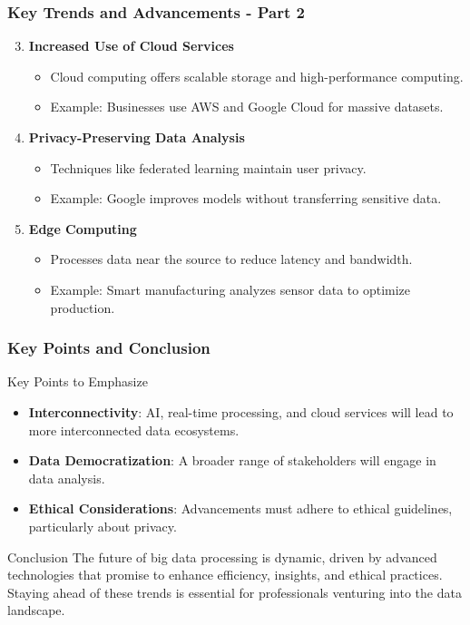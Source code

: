 \documentclass[aspectratio=169]{beamer}
\begin{document}
\begin{frame}[fragile]
    \frametitle{Key Trends and Advancements - Part 2}
    \begin{enumerate}
        \setcounter{enumi}{2} %
        \item \textbf{Increased Use of Cloud Services}
            \begin{itemize}
                \item Cloud computing offers scalable storage and high-performance computing.
                \item Example: Businesses use AWS and Google Cloud for massive datasets.
            \end{itemize}
        
        \item \textbf{Privacy-Preserving Data Analysis}
            \begin{itemize}
                \item Techniques like federated learning maintain user privacy.
                \item Example: Google improves models without transferring sensitive data.
            \end{itemize}
        
        \item \textbf{Edge Computing}
            \begin{itemize}
                \item Processes data near the source to reduce latency and bandwidth.
                \item Example: Smart manufacturing analyzes sensor data to optimize production.
            \end{itemize}
    \end{enumerate}
\end{frame}

\begin{frame}[fragile]
    \frametitle{Key Points and Conclusion}
    \begin{block}{Key Points to Emphasize}
        \begin{itemize}
            \item \textbf{Interconnectivity}: AI, real-time processing, and cloud services will lead to more interconnected data ecosystems.
            \item \textbf{Data Democratization}: A broader range of stakeholders will engage in data analysis.
            \item \textbf{Ethical Considerations}: Advancements must adhere to ethical guidelines, particularly about privacy.
        \end{itemize}
    \end{block}
    
    \begin{block}{Conclusion}
        The future of big data processing is dynamic, driven by advanced technologies that promise to enhance efficiency, insights, and ethical practices. Staying ahead of these trends is essential for professionals venturing into the data landscape.
    \end{block}
\end{frame}
\end{document}
